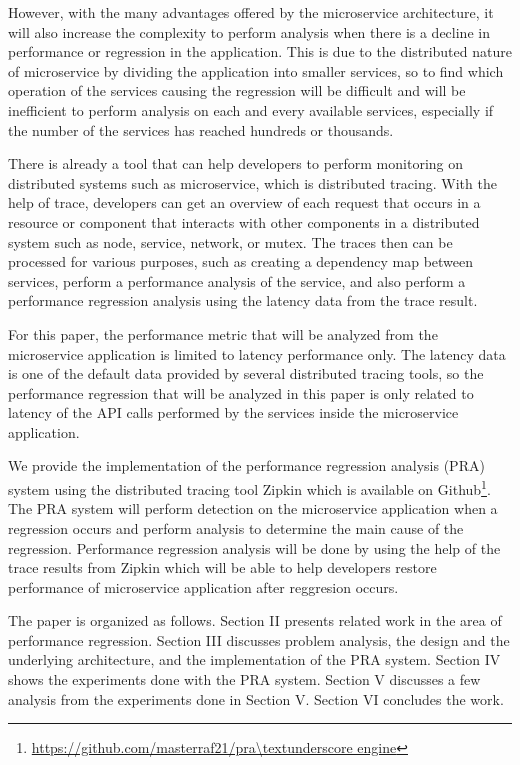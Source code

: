 \documentclass[conference]{configs/IEEEtran}
\begin{document}
However, with the many advantages offered by the microservice architecture, it will also increase the complexity to perform analysis when there is a decline in performance or regression in the application. This is due to the distributed nature of microservice by dividing the application into smaller services, so to find which operation of the services causing the regression will be difficult and will be inefficient to perform analysis on each and every available services, especially if the number of the services has reached hundreds or thousands.

There is already a tool that can help developers to perform monitoring on distributed systems such as microservice, which is distributed tracing. With the help of trace, developers can get an overview of each request that occurs in a resource or component that interacts with other components in a distributed system such as node, service, network, or mutex. The traces then can be processed for various purposes, such as creating a dependency map between services, perform a performance analysis of the service, and also perform a performance regression analysis using the latency data from the trace result.

For this paper, the performance metric that will be analyzed from the microservice application is limited to latency performance only. The latency data is one of the default data provided by several distributed tracing tools, so the performance regression that will be analyzed in this paper is only related to latency of the API calls performed by the services inside the microservice application.

We provide the implementation of the performance regression analysis (PRA) system using the distributed tracing tool Zipkin which is available on Github\footnote{\url{https://github.com/masterraf21/pra\textunderscore engine}}. The PRA system will perform detection on the microservice application when a regression occurs and perform analysis to determine the main cause of the regression. Performance regression analysis will be done by using the help of the trace results from Zipkin which will be able to help developers restore performance of microservice application after reggresion occurs.

The paper is organized as follows. Section II presents related
work in the area of performance regression. Section III discusses problem analysis, the design and the underlying architecture, and the implementation of the PRA system. Section IV shows the experiments done with the PRA system. Section V discusses a few analysis from the experiments done in Section V. Section
VI concludes the work.
\end{document}
